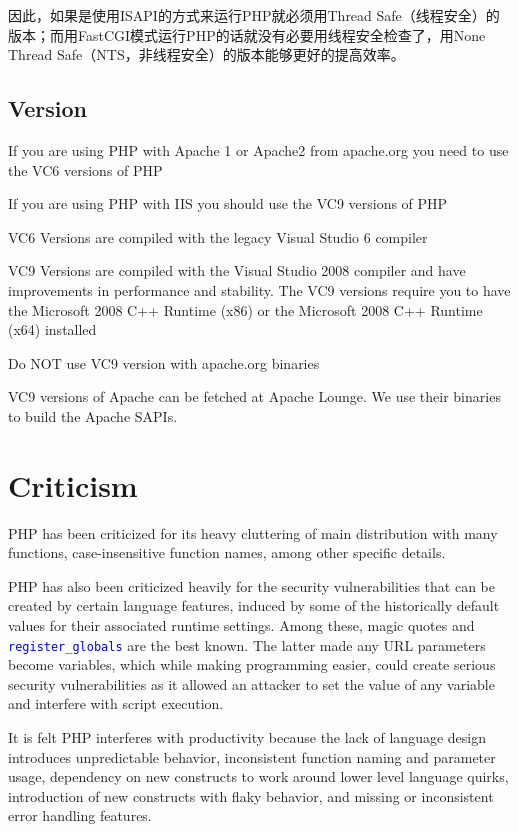 因此，如果是使用ISAPI的方式来运行PHP就必须用Thread Safe（线程安全）的版本；而用FastCGI模式运行PHP的话就没有必要用线程安全检查了，用None Thread Safe（NTS，非线程安全）的版本能够更好的提高效率。

\section{Version}

If you are using PHP with Apache 1 or Apache2 from apache.org you need to use the VC6 versions of PHP

If you are using PHP with IIS you should use the VC9 versions of PHP

VC6 Versions are compiled with the legacy Visual Studio 6 compiler

VC9 Versions are compiled with the Visual Studio 2008 compiler and have improvements in performance and stability. The VC9 versions require you to have the Microsoft 2008 C++ Runtime (x86) or the Microsoft 2008 C++ Runtime (x64) installed

Do NOT use VC9 version with apache.org binaries

VC9 versions of Apache can be fetched at Apache Lounge. We use their binaries to build the Apache SAPIs.







\chapter{Criticism}




PHP has been criticized for its heavy cluttering of main distribution with many functions, case-insensitive function names, among other specific details.


PHP has also been criticized heavily for the security vulnerabilities that can be created by certain language features, induced by some of the historically default values for their associated runtime settings. Among these, magic quotes and \textcolor{Blue}{\texttt{register\_globals}} are the best known. The latter made any URL parameters become variables, which while making programming easier, could create serious security vulnerabilities as it allowed an attacker to set the value of any variable and interfere with script execution.

It is felt PHP interferes with productivity because the lack of language design introduces unpredictable behavior, inconsistent function naming and parameter usage, dependency on new constructs to work around lower level language quirks, introduction of new constructs with flaky behavior, and missing or inconsistent error handling features.


